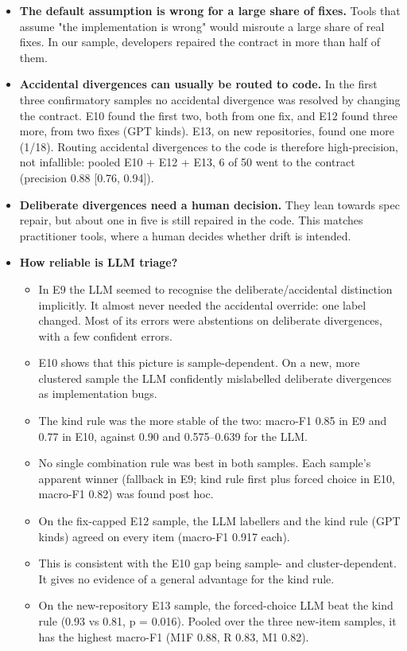 \documentclass[acmsmall,screen,review,anonymous]{acmart}
\begin{document}
\begin{itemize}
\item \textbf{The default assumption is wrong for a large share of fixes.} Tools that assume "the implementation is wrong" would misroute a large share of real fixes. In our sample, developers repaired the contract in more than half of them.
\item \textbf{Accidental divergences can usually be routed to code.} In the first three confirmatory samples no accidental divergence was resolved by changing the contract. E10 found the first two, both from one fix, and E12 found three more, from two fixes (GPT kinds). E13, on new repositories, found one more (1/18). Routing accidental divergences to the code is therefore high-precision, not infallible: pooled E10 + E12 + E13, 6 of 50 went to the contract (precision 0.88 [0.76, 0.94]).
\item \textbf{Deliberate divergences need a human decision.} They lean towards spec repair, but about one in five is still repaired in the code. This matches practitioner tools, where a human decides whether drift is intended.
\item \textbf{How reliable is LLM triage?}
\begin{itemize}
\item In E9 the LLM seemed to recognise the deliberate/accidental distinction implicitly. It almost never needed the accidental override: one label changed. Most of its errors were abstentions on deliberate divergences, with a few confident errors.
\item E10 shows that this picture is sample-dependent. On a new, more clustered sample the LLM confidently mislabelled deliberate divergences as implementation bugs.
\item The kind rule was the more stable of the two: macro-F1 0.85 in E9 and 0.77 in E10, against 0.90 and 0.575--0.639 for the LLM.
\item No single combination rule was best in both samples. Each sample's apparent winner (fallback in E9; kind rule first plus forced choice in E10, macro-F1 0.82) was found post hoc.
\item On the fix-capped E12 sample, the LLM labellers and the kind rule (GPT kinds) agreed on every item (macro-F1 0.917 each).
\item This is consistent with the E10 gap being sample- and cluster-dependent. It gives no evidence of a general advantage for the kind rule.
\item On the new-repository E13 sample, the forced-choice LLM beat the kind rule (0.93 vs 0.81, p = 0.016). Pooled over the three new-item samples, it has the highest macro-F1 (M1F 0.88, R 0.83, M1 0.82).

\end{itemize}
\end{itemize}
\end{document}
